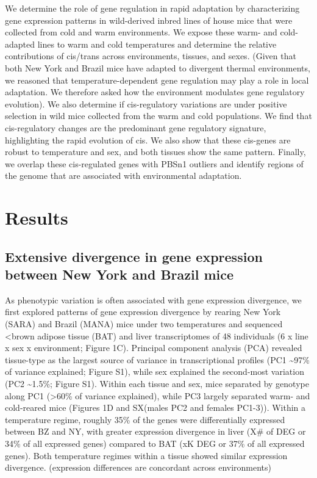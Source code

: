 \documentclass[9pt,twocolumn,twoside,lineno]{pnas-new}
\begin{document}
We determine the role of gene regulation in rapid adaptation by
characterizing gene expression patterns in wild-derived inbred lines of
house mice that were collected from cold and warm environments. We
expose these warm- and cold-adapted lines to warm and cold temperatures
and determine the relative contributions of cis/trans across
environments, tissues, and sexes. (Given that both New York and Brazil
mice have adapted to divergent thermal environments, we reasoned that
temperature-dependent gene regulation may play a role in local
adaptation. We therefore asked how the environment modulates gene
regulatory evolution). We also determine if cis-regulatory variations
are under positive selection in wild mice collected from the warm and
cold populations. We find that cis-regulatory changes are the
predominant gene regulatory signature, highlighting the rapid evolution
of cis. We also show that these cis-genes are robust to temperature and
sex, and both tissues show the same pattern. Finally, we overlap these
cis-regulated genes with PBSn1 outliers and identify regions of the
genome that are associated with environmental adaptation.

\hypertarget{results}{%
\section*{Results}\label{results}}

\hypertarget{extensive-divergence-in-gene-expression-between-new-york-and-brazil-mice}{%
\subsection*{Extensive divergence in gene expression between New York
and Brazil
mice}\label{extensive-divergence-in-gene-expression-between-new-york-and-brazil-mice}}

As phenotypic variation is often associated with gene expression
divergence, we first explored patterns of gene expression divergence by
rearing New York (SARA) and Brazil (MANA) mice under two temperatures
and sequenced \textless brown adipose tissue (BAT) and liver
transcriptomes of 48 individuals (6 x line x sex x environment; Figure
1C). Principal component analysis (PCA) revealed tissue-type as the
largest source of variance in transcriptional profiles (PC1
\textasciitilde97\% of variance explained; Figure S1), while sex
explained the second-most variation (PC2 \textasciitilde1.5\%; Figure
S1). Within each tissue and sex, mice separated by genotype along PC1
(\textgreater60\% of variance explained), while PC3 largely separated
warm- and cold-reared mice (Figures 1D and SX(males PC2 and females
PC1-3)). Within a temperature regime, roughly 35\% of the genes were
differentially expressed between BZ and NY, with greater expression
divergence in liver (X\# of DEG or 34\% of all expressed genes) compared
to BAT (xK DEG or 37\% of all expressed genes). Both temperature regimes
within a tissue showed similar expression divergence. (expression
differences are concordant across environments)
\end{document}
